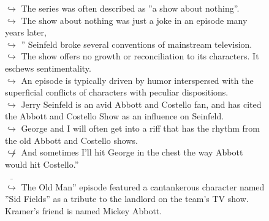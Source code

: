 \documentclass[11pt,a4paper, onecolumn]{article}
\begin{document}
\begin{figure}[t] \small \begin{tcolorbox}[boxsep=0pt,left=5pt,right=0pt,top=2pt,colback = yellow!5] \begin{dialogue}
 \small 
\colorbox{pink!25}{$\hookrightarrow$}
{ The series was often described as ''a show about nothing''. }
\\
\colorbox{pink!25}{$\hookrightarrow$}
{ The show about nothing was just a joke in an episode many years later, }
\\
\colorbox{pink!25}{$\hookrightarrow$}
{ '' Seinfeld broke several conventions of mainstream television. }
\\
\colorbox{pink!25}{$\hookrightarrow$}
{ The show offers no growth or reconciliation to its characters. It eschews sentimentality. }
\\
\colorbox{pink!25}{$\hookrightarrow$}
{ An episode is typically driven by humor interspersed with the superficial conflicts of characters with peculiar dispositions. }
\\
\colorbox{pink!25}{$\hookrightarrow$}
{ Jerry Seinfeld is an avid Abbott and Costello fan, and has cited the Abbott and Costello Show as an influence on Seinfeld. }
\\
\colorbox{pink!25}{$\hookrightarrow$}
{ George and I will often get into a riff that has the rhythm from the old Abbott and Costello shows. }
\\
\colorbox{pink!25}{$\not\hookrightarrow$}
{ And sometimes I'll hit George in the chest the way Abbott would hit Costello.'' }
 \end{dialogue}\end{tcolorbox}\end{figure}\begin{figure}[t] \small \begin{tcolorbox}[boxsep=0pt,left=5pt,right=0pt,top=2pt,colback = yellow!5] \begin{dialogue}
 \small 
\colorbox{pink!25}{ $\bar{\hookrightarrow}$}
{ The Old Man'' episode featured a cantankerous character named ''Sid Fields'' as a tribute to the landlord on the team's TV show. Kramer's friend is named Mickey Abbott. }
\\
 \end{dialogue}\end{tcolorbox}\end{figure}
\end{document}
